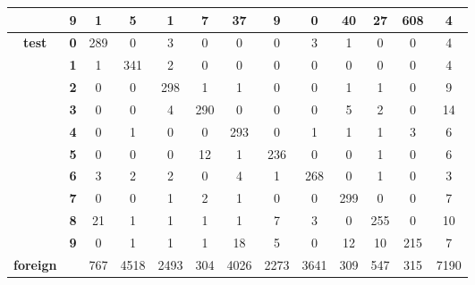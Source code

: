 \begin{table}[htp]
{\begin{tabular}{|c|c|c|c|c|c|c|c|c|c|c|c|c|}
		& \textbf{9} & 1          & 5          & 1          & 7          & 37         & 9          & 0          & 40         & 27         & 608        & 4                \\ \hline
		\multirow{10}{*}{\textbf{test}}     & \textbf{0} & 289        & 0          & 3          & 0          & 0          & 0          & 3          & 1          & 0          & 0          & 4                \\ \cline{2-13} 
		& \textbf{1} & 1          & 341        & 2          & 0          & 0          & 0          & 0          & 0          & 0          & 0          & 4                \\ \cline{2-13} 
		& \textbf{2} & 0          & 0          & 298        & 1          & 1          & 0          & 0          & 1          & 1          & 0          & 9                \\ \cline{2-13} 
		& \textbf{3} & 0          & 0          & 4          & 290        & 0          & 0          & 0          & 5          & 2          & 0          & 14               \\ \cline{2-13} 
		& \textbf{4} & 0          & 1          & 0          & 0          & 293        & 0          & 1          & 1          & 1          & 3          & 6                \\ \cline{2-13} 
		& \textbf{5} & 0          & 0          & 0          & 12         & 1          & 236        & 0          & 0          & 1          & 0          & 6                \\ \cline{2-13} 
		& \textbf{6} & 3          & 2          & 2          & 0          & 4          & 1          & 268        & 0          & 1          & 0          & 3                \\ \cline{2-13} 
		& \textbf{7} & 0          & 0          & 1          & 2          & 1          & 0          & 0          & 299        & 0          & 0          & 7                \\ \cline{2-13} 
		& \textbf{8} & 21         & 1          & 1          & 1          & 1          & 7          & 3          & 0          & 255        & 0          & 10               \\ \cline{2-13} 
		& \textbf{9} & 0          & 1          & 1          & 1          & 18         & 5          & 0          & 12         & 10         & 215        & 7                \\ \hline
		\textbf{foreign}                    & \textbf{}  & 767        & 4518       & 2493       & 304        & 4026       & 2273       & 3641       & 309        & 547        & 315        & 7190             \\ \hline
	\end{tabular}
}
\end{table}

